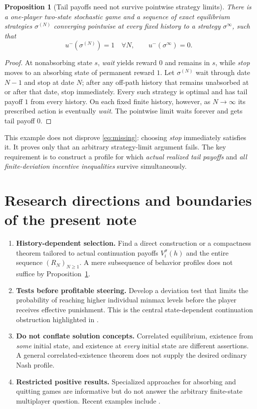 \documentclass[11pt,a4paper]{article}
\numberwithin{equation}{section}
\newtheorem{proposition}[theorem]{Proposition}
\theoremstyle{definition}
\theoremstyle{remark}
\newcommand{\sig}{\sigma}
\begin{document}
\begin{proposition}[Tail payoffs need not survive pointwise strategy limits]
\label{ex:compact}
There is a one-player two-state stochastic game and a sequence of exact
equilibrium strategies $\sig^{(N)}$ converging pointwise at every fixed
history to a strategy $\sig^\infty$, such that
\[
 u^-(\sig^{(N)})=1\quad\forall N,
 \qquad u^-(\sig^\infty)=0.
\]
\end{proposition}
\begin{proof}
At nonabsorbing state $s$, \emph{wait} yields reward $0$ and remains in
$s$, while \emph{stop} moves to an absorbing state of permanent reward
$1$. Let $\sig^{(N)}$ wait through date $N-1$ and stop at date $N$;
after any off-path history that remains unabsorbed at or after that date,
stop immediately. Every such strategy is optimal and has tail payoff
$1$ from every history. On each fixed finite history, however, as
$N\to\infty$ its prescribed action is eventually \emph{wait}. The
pointwise limit waits forever and gets tail payoff $0$.
\end{proof}
This example does not disprove \eqref{eq:missing}: choosing \emph{stop}
immediately satisfies it. It proves only that an arbitrary strategy-limit
argument fails. The key requirement is to construct a profile for which
\emph{actual realized tail payoffs} and \emph{all finite-deviation
incentive inequalities} survive simultaneously.

\section{Research directions and boundaries of the present note}
\begin{enumerate}[label=\textbf{\arabic*.},leftmargin=*]
\item \textbf{History-dependent selection.} Find a direct construction or a
compactness theorem tailored to actual continuation payoffs
$V_i^\sig(h)$ and the entire sequence $(R_N)_{N\ge1}$.
A mere subsequence of behavior profiles does not suffice by
Proposition~\ref{ex:compact}.
\item \textbf{Tests before profitable steering.} Develop a deviation test
that limits the probability of reaching higher individual minmax levels
before the player receives effective punishment. This is the central
state-dependent continuation obstruction highlighted in
\cite{fleschsolan2023}.
\item \textbf{Do not conflate solution concepts.} Correlated equilibrium,
existence from \emph{some} initial state, and existence at \emph{every}
initial state are different assertions. A general correlated-existence
theorem does not supply the desired ordinary Nash profile.
\item \textbf{Restricted positive results.} Specialized approaches for
absorbing and quitting games are informative but do not answer the
arbitrary finite-state multiplayer question. Recent examples include
\cite{solanvieille2025,aps2026}.
\end{enumerate}
\end{document}
